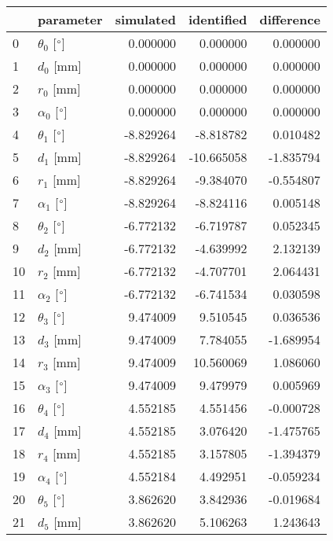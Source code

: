 \documentclass{standalone}%
\begin{document}
%
\normalsize%
\begin{tabular}{llrrr}
\toprule
{} &                 parameter & simulated & identified & difference \\
\midrule
0  &  $\theta_{0}$ [$\degree$] &  0.000000 &   0.000000 &   0.000000 \\
1  &              $d_{0}$ [mm] &  0.000000 &   0.000000 &   0.000000 \\
2  &              $r_{0}$ [mm] &  0.000000 &   0.000000 &   0.000000 \\
3  &  $\alpha_{0}$ [$\degree$] &  0.000000 &   0.000000 &   0.000000 \\
4  &  $\theta_{1}$ [$\degree$] & -8.829264 &  -8.818782 &   0.010482 \\
5  &              $d_{1}$ [mm] & -8.829264 & -10.665058 &  -1.835794 \\
6  &              $r_{1}$ [mm] & -8.829264 &  -9.384070 &  -0.554807 \\
7  &  $\alpha_{1}$ [$\degree$] & -8.829264 &  -8.824116 &   0.005148 \\
8  &  $\theta_{2}$ [$\degree$] & -6.772132 &  -6.719787 &   0.052345 \\
9  &              $d_{2}$ [mm] & -6.772132 &  -4.639992 &   2.132139 \\
10 &              $r_{2}$ [mm] & -6.772132 &  -4.707701 &   2.064431 \\
11 &  $\alpha_{2}$ [$\degree$] & -6.772132 &  -6.741534 &   0.030598 \\
12 &  $\theta_{3}$ [$\degree$] &  9.474009 &   9.510545 &   0.036536 \\
13 &              $d_{3}$ [mm] &  9.474009 &   7.784055 &  -1.689954 \\
14 &              $r_{3}$ [mm] &  9.474009 &  10.560069 &   1.086060 \\
15 &  $\alpha_{3}$ [$\degree$] &  9.474009 &   9.479979 &   0.005969 \\
16 &  $\theta_{4}$ [$\degree$] &  4.552185 &   4.551456 &  -0.000728 \\
17 &              $d_{4}$ [mm] &  4.552185 &   3.076420 &  -1.475765 \\
18 &              $r_{4}$ [mm] &  4.552185 &   3.157805 &  -1.394379 \\
19 &  $\alpha_{4}$ [$\degree$] &  4.552184 &   4.492951 &  -0.059234 \\
20 &  $\theta_{5}$ [$\degree$] &  3.862620 &   3.842936 &  -0.019684 \\
21 &              $d_{5}$ [mm] &  3.862620 &   5.106263 &   1.243643 \\

\end{tabular}
\end{document}
